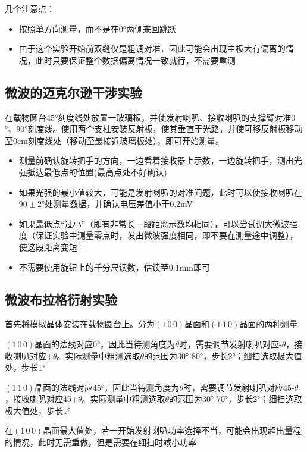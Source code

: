 \documentclass[11pt]{article}
\begin{document}
	几个注意点：
	\begin{itemize}
		\item 按照单方向测量，而不是在0°两侧来回跳跃
		\item 由于这个实验开始前双缝仅是粗调对准，因此可能会出现主极大有偏离的情况，此时只要保证整个数据偏离情况一致就行，不需要重测
	\end{itemize}
	
	
	\subsection{微波的迈克尔逊干涉实验}
	
	在载物圆台$45$°刻度线处放置一玻璃板，并使发射喇叭、接收喇叭的支撑臂对准$0$°、$90$°刻度线。使用两个支柱安装反射板，使其垂直于光路，并使可移反射板移动至0cm刻度线处（移动至最接近玻璃板处），即可开始测量。
	\begin{itemize}
		\item 测量前确认旋转把手的方向，一边看着接收器上示数，一边旋转把手，测出光强抵达最低点的位置(最高点处不好确认)
		\item 如果光强的最小值较大，可能是发射喇叭的对准问题，此时可以使接收喇叭在$90\pm 2°$处测量数据，并确认电压差值小于0.2mV
		\item 如果最低点“过小”（即有非常长一段距离示数均相同），可以尝试调大微波强度（保证实验中测量零点时，发出微波强度相同，即不要在测量途中调整），使这段距离变短
		\item 不需要使用旋钮上的千分尺读数，估读至$0.1$mm即可
	\end{itemize}


	\subsection{微波布拉格衍射实验}
	
	首先将模拟晶体安装在载物圆台上。分为$(1\,0\,0)$晶面和$(1\,1\,0)$晶面的两种测量
	
	$(1\,0\,0)$晶面的法线对应0°，因此当待测角度为$\theta$时，需要调节发射喇叭对应-$\theta$，接收喇叭对应+$\theta$。实际测量中粗测选取$\theta$的范围为30°-80°，步长2°；细扫选取极大值处，步长1°
	
	$(1\,1\,0)$晶面的法线对应45°，因此当待测角度为$\theta$时，需要调节发射喇叭对应45-$\theta$，接收喇叭对应45+$\theta$。实际测量中粗测选取$\theta$的范围为30°-70°，步长2°；细扫选取极大值处，步长1°
	
	在$(1\,0\,0)$晶面最大值处，若一开始发射喇叭功率选择不当，可能会出现超出量程的情况，此时无需重做，但是需要在细扫时减小功率
	
\end{document}
